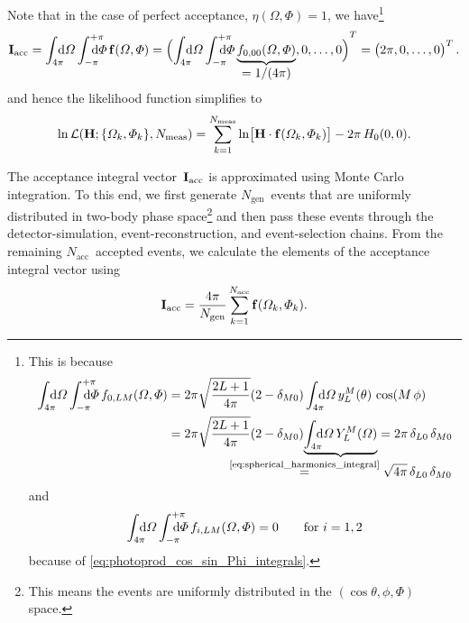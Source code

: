 Note that in the case of perfect acceptance, \ie $\eta(\Omega, \Phi) =
1$, we have\footnote{This is because
\begin{align}
  \int_{4 \pi}\!\!\!\! \dif{\Omega} \int_{-\pi}^{+\pi}\hspace{-1.2em} \dif{\Phi}\, f_{0, L M}(\Omega, \Phi)
  ={}& 2 \pi \sqrt{\frac{2 L + 1}{4 \pi}} (2 - \delta_{M 0}) \int_{4 \pi}\!\!\!\! \dif{\Omega}\, y_L^M(\theta)\, \cos(M\, \phi)
  \nonumber \\
  ={}& 2 \pi \sqrt{\frac{2 L + 1}{4 \pi}} (2 - \delta_{M 0}) \cdUnderbrace{\int_{4 \pi}\!\!\!\! \dif{\Omega}\, Y_L^M(\Omega)}{\equalUsing{\cref{eq:spherical_harmonics_integral}}{} \sqrt{4 \pi}\, \delta_{L 0}\, \delta_{M 0}}
  = 2 \pi\, \delta_{L 0}\, \delta_{M 0}
\end{align}
and
\begin{equation}
  \int_{4 \pi}\!\!\!\! \dif{\Omega} \int_{-\pi}^{+\pi}\hspace{-1.2em} \dif{\Phi}\, f_{i, L M}(\Omega, \Phi)
  = 0
  \qquad\text{for $i = 1, 2$}
\end{equation}
because of \cref{eq:photoprod_cos_sin_Phi_integrals}.}
\begin{equation}
  \vect{I}_\text{acc}
  = \int_{4 \pi}\!\!\!\! \dif{\Omega} \int_{-\pi}^{+\pi}\hspace{-1.2em} \dif{\Phi}\, \vect{f}(\Omega, \Phi)
  = \rBrk[2]{\int_{4 \pi}\!\!\!\! \dif{\Omega} \int_{-\pi}^{+\pi}\hspace{-1.2em} \dif{\Phi}\, \dUnderbrace{f_{0, 0 0}(\Omega, \Phi)}{= 1 / (4 \pi)}, 0, \ldots, 0}^T
  = \rBrk[1]{2 \pi, 0, \ldots, 0}^T.
\end{equation}
and hence the likelihood function simplifies to
\begin{align}
  \ln \mathcal{L}(\vect{H}; \set{\Omega_k, \Phi_k}, N_\text{meas})
  = \sum_{k = 1}^{N_\text{meas}} \ln\!\sBrk[1]{\vect{H} \cdot \vect{f}(\Omega_k, \Phi_k)}
  - 2 \pi\, H_0(0, 0).
\end{align}

The acceptance integral vector~$\bm{\mathrm{I}}_\text{acc}$ is approximated
using Monte Carlo integration.  To this end, we first generate
$N_\text{gen}$~events that are uniformly distributed in two-body phase
space\footnote{This means the events are uniformly distributed in the
$(\cos\theta, \phi, \Phi)$ space.} and then pass these events through
the detector-simulation, event-reconstruction, and event-selection
chains.  From the remaining $N_\text{acc}$~accepted events, we
calculate the elements of the acceptance integral vector
using
\begin{equation}
  \label{eq:photoprod_acceptance_integral_vector}
  \bm{\mathrm{I}}_\text{acc}
  = \frac{4 \pi}{N_\text{gen}} \sum_{k = 1}^{N_\text{acc}} \bm{\mathrm{f}}(\Omega_k, \Phi_k).
\end{equation}

